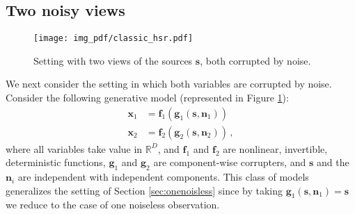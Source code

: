 \subsection{Two noisy views}
\label{sec:constrained}

\begin{figure}[t!]
    \centering
    \texttt{[image: img\_pdf/classic\_hsr.pdf]}
    \caption{Setting with two views of the sources $\bm{s}$, both corrupted by noise.}
    \label{fig:classic_hsr}
\end{figure}

We next consider the setting in which both variables are corrupted by noise.
Consider the following generative model (represented in Figure \ref{fig:classic_hsr}):
\begin{align*}
\bm{x}_{1}&=\bm{f}_{1}(\bm{g}_{1}(\bm{s},\bm{n}_{1}))  \\
\bm{x}_{2}&=\bm{f}_{2}(\bm{g}_{2}(\bm{s},\bm{n}_{2}))  \,,
\end{align*}
where all variables take value in $\mathbb{R}^D$, and $\bm{f}_{1}$ and $\bm{f}_{2}$ are nonlinear, invertible, deterministic functions,
$\bm{g}_{1}$ and $\bm{g}_{2}$ are component-wise corrupters, and $\bm{s}$ and the $\bm{n}_i$ are independent with independent components.
This class of models generalizes the setting of Section \ref{sec:onenoisless} since by taking $\bm{g}_1(\bm{s}, \bm{n}_1) = \bm{s}$ we reduce to the case of one noiseless observation.

